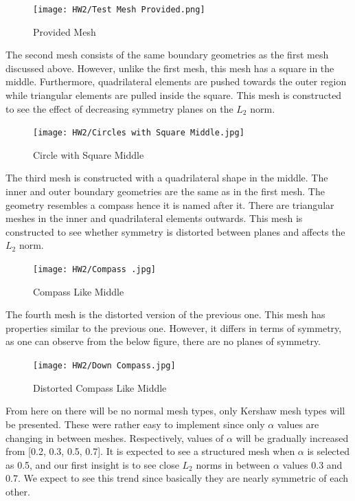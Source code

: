 \documentclass[a4paper, 12pt]{article}
\begin{document}
\begin{figure}[h]
    \centering
    \texttt{[image: HW2/Test Mesh Provided.png]}
    \caption{Provided Mesh}
\end{figure} \par

The second mesh consists of the same boundary geometries as the first mesh discussed above. However, unlike the first mesh, this mesh has a square in the middle. Furthermore, quadrilateral elements are pushed towards the outer region while triangular elements are pulled inside the square. This mesh is constructed to see the effect of decreasing symmetry planes on the $L_2$ norm. \\\par

\begin{figure}[h]
    \centering
    \texttt{[image: HW2/Circles with Square Middle.jpg]}
    \caption{Circle with Square Middle}
\end{figure}\par

The third mesh is constructed with a quadrilateral shape in the middle. The inner and outer boundary geometries are the same as in the first mesh. The geometry resembles a compass hence it is named after it. There are triangular meshes in the inner and quadrilateral elements outwards. This mesh is constructed to see whether symmetry is distorted between planes and affects the $L_2$ norm.\\\par 

\begin{figure}[h]
    \centering
    \texttt{[image: HW2/Compass .jpg]}
    \caption{Compass Like Middle}
\end{figure}\par


The fourth mesh is the distorted version of the previous one. This mesh has properties similar to the previous one. However, it differs in terms of symmetry, as one can observe from the below figure, there are no planes of symmetry.\\\par


\begin{figure}[h]
    \centering
    \texttt{[image: HW2/Down Compass.jpg]}
    \caption{Distorted Compass Like Middle}
    \label{mesh4}
\end{figure}\par

From here on there will be no normal mesh types, only Kershaw mesh types will be presented. These were rather easy to implement since only $\alpha$ values are changing in between meshes. Respectively, values of $\alpha$ will be gradually increased from [0.2, 0.3, 0.5, 0.7]. It is expected to see a structured mesh when $\alpha$ is selected as 0.5, and our first insight is to see close $L_2$ norms in between $\alpha$ values 0.3 and 0.7. We expect to see this trend since basically they are nearly symmetric of each other. \\\par
\end{document}

